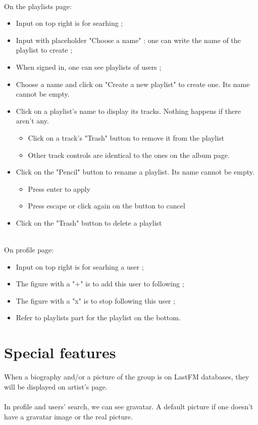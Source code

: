 \documentclass[11pt]{article}
\begin{document}
        \noindent \\
        On the playlists page:
        \begin{itemize}
     	\item Input on top right is for searhing ;
        \item Input with placeholder "Choose a name" : one can write the name of the playlist to create ;
   		\item When signed in, one can see playlists of users ;
        \item Choose a name and click on "Create a new playlist" to create one. Its name cannot be empty.
        \item Click on a playlist's name to display its tracks. Nothing happens if there aren't any.
            \begin{itemize}
            \item Click on a track's "Trash" button to remove it from the playlist
            \item Other track controls are identical to the ones on the album page.
            \end{itemize}
        \item Click on the "Pencil" button to rename a playlist. Its name cannot be empty.
            \begin{itemize}
            \item Press enter to apply
            \item Press escape or click again on the button to cancel
            \end{itemize}
        \item Click on the "Trash" button to delete a playlist
        \end{itemize}
	    \noindent \\
		On profile page:
	    \begin{itemize}
    	\item Input on top right is for searhing a user ;
    	\item The figure with a "+" is to add this user to following ;
    	\item The figure with a "x" is to stop following this user ;
    	\item Refer to playlists part for the playlist on the bottom.
        \end{itemize}


	\section{Special features}
	\noindent
	When a biography and/or a picture of the group is on LastFM databases, they will be displayed on artist's page.
	\\
	\\
	In profile and users' search, we can see gravatar. A default picture if one doesn't have a gravatar image or the real picture.
\end{document}
